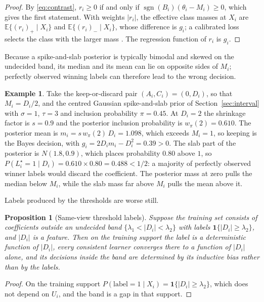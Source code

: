 \documentclass[11pt]{article}
\theoremstyle{plain}
\newtheorem{proposition}{Proposition}
\theoremstyle{definition}
\newtheorem{example}{Example}
\theoremstyle{remark}
\newcommand{\E}{\mathbb E}
\newcommand{\ind}{\mathbf 1}
\DeclareMathOperator{\sgn}{sgn}
\begin{document}
\begin{proof}
By \eqref{eq:contrast}, $r_i\ge0$ if and only if $\sgn(B_i)(\theta_i-M_i)\ge0$, which gives
the first statement. With weights $|r_i|$, the effective class masses at $X_i$ are
$\E\{(r_i)_+\mid X_i\}$ and $\E\{(r_i)_-\mid X_i\}$, whose difference is $g_i$; a calibrated
loss selects the class with the larger mass \citep{elkan2001foundations,scott2012calibrated}.
The regression function of $r_i$ is $g_i$.
\end{proof}

Because a spike-and-slab posterior is typically bimodal and skewed on the undecided band,
its median and its mean can lie on opposite sides of $M_i$; perfectly observed winning
labels can therefore lead to the wrong decision.

\begin{example}\label{ex:median}
Take the keep-or-discard pair $(A_i,C_i)=(0,D_i)$, so that $M_i=D_i/2$, and the centred
Gaussian spike-and-slab prior of Section~\ref{sec:interval} with $\sigma=1$, $\tau=3$ and
inclusion probability $\pi=0.45$. At $D_i=2$ the shrinkage factor is $s=0.9$ and the posterior
inclusion probability is $w_\pi(2)=0.610$. The posterior mean is $m_i=s\,w_\pi(2)\,D_i=1.098$,
which exceeds $M_i=1$, so keeping is the Bayes decision, with $g_i=2D_im_i-D_i^2=0.39>0$.
The slab part of the posterior is $N(1.8,0.9)$, which places probability $0.80$ above $1$,
so $P(L_i^\star=1\mid D_i)=0.610\times0.80=0.488<1/2$: a majority of perfectly observed winner
labels would discard the coefficient. The posterior mass at zero pulls the median below
$M_i$, while the slab mass far above $M_i$ pulls the mean above it.
\end{example}

Labels produced by the thresholds are worse still.

\begin{proposition}[Same-view threshold labels]\label{prop:leak}
Suppose the training set consists of coefficients outside an undecided band
$\{\lambda_1<|D_i|<\lambda_2\}$ with labels $\ind\{|D_i|\ge\lambda_2\}$, and $|D_i|$ is a
feature. Then on the training support the label is a deterministic function of $|D_i|$,
every consistent learner converges there to a function of $|D_i|$ alone, and its decisions
inside the band are determined by its inductive bias rather than by the labels.
\end{proposition}

\begin{proof}
On the training support $P(\text{label}=1\mid X_i)=\ind\{|D_i|\ge\lambda_2\}$, which does
not depend on $U_i$, and the band is a gap in that support.
\end{proof}
\end{document}
